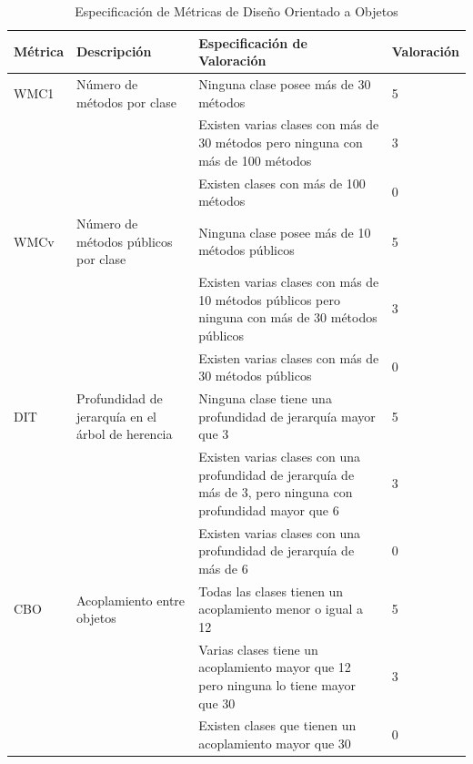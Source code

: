 \documentclass[11pt]{article}
\begin{document}
\begin{table}[H]
  \begin{center}
    \begin{tabular}{ | p{1.6cm} | p{3cm} | p{8cm} | p{2cm} | }
    \toprule
    \textbf{Métrica} & \textbf{Descripción} & \textbf{Especificación de Valoración} & \textbf{Valoración} \\
    \hline
    WMC1 & Número de métodos por clase & Ninguna clase posee más de 30 métodos & 5 \\ \cline{3-3} \cline{4-4} 
    & & Existen varias clases con más de 30 métodos pero ninguna con más de 100 métodos & 3 \\ \cline{3-3}\cline{4-4}
    & & Existen clases con más de 100 métodos & 0 \\ \cline{3-3}\cline{4-4}
    \hline
    WMCv & Número de métodos públicos por clase & Ninguna clase posee más de 10 métodos públicos & 5 \\ \cline{3-3} \cline{4-4} 
    & & Existen varias clases con más de 10 métodos públicos pero ninguna con más de 30 métodos públicos & 3 \\ \cline{3-3}\cline{4-4}
    & & Existen varias clases con más de 30 métodos públicos & 0 \\ \cline{3-3}\cline{4-4}
    \hline
    DIT & Profundidad de jerarquía en el árbol de herencia & Ninguna clase tiene una profundidad de jerarquía mayor que 3 & 5 \\ \cline{3-3} \cline{4-4} 
    & & Existen varias clases con una profundidad de jerarquía de más de 3, pero ninguna con profundidad mayor que 6 & 3 \\ \cline{3-3}\cline{4-4}
    & & Existen varias clases con una profundidad de jerarquía de más de 6  & 0 \\ \cline{3-3}\cline{4-4}
    \hline
    CBO & Acoplamiento entre objetos & Todas las clases tienen un acoplamiento menor o igual a 12 & 5 \\ \cline{3-3} \cline{4-4} 
    & & Varias clases tiene un acoplamiento mayor que 12 pero ninguna lo tiene mayor que 30 & 3 \\ \cline{3-3}\cline{4-4}
    & & Existen clases que tienen un acoplamiento mayor que 30 & 0 \\ 
    \bottomrule
    \end{tabular}
    \caption{Especificación de Métricas de Diseño Orientado a Objetos}
    \label{tab:metrics_ood}
  \end{center}
\end{table}
\end{document}
